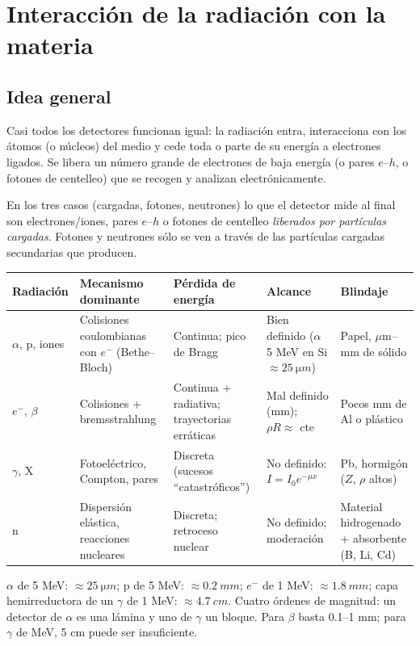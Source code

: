 \chapter{Interacción de la radiación con la materia}

\section{Idea general}
Casi todos los detectores funcionan igual: la radiación entra, interacciona con los átomos
(o núcleos) del medio y cede toda o parte de su energía a electrones ligados. Se libera un
número grande de electrones de baja energía (o pares $e$--$h$, o fotones de centelleo) que se
recogen y analizan electrónicamente.

\begin{clave}
En los tres casos (cargadas, fotones, neutrones) lo que el detector mide al final son
electrones/iones, pares $e$--$h$ o fotones de centelleo \emph{liberados por partículas cargadas}.
Fotones y neutrones sólo se ven a través de las partículas cargadas secundarias que producen.
\end{clave}

\begin{center}\small
\begin{tabularx}{\linewidth}{lXXXX}
\toprule
Radiación & Mecanismo dominante & Pérdida de energía & Alcance & Blindaje \\
\midrule
$\alpha$, p, iones & Colisiones coulombianas con $e^-$ (Bethe--Bloch) & Continua; pico de Bragg & Bien definido ($\alpha$ 5 MeV en Si $\approx\SI{25}{\micro m}$) & Papel, $\mu$m--mm de sólido\\
$e^-$, $\beta$ & Colisiones + bremsstrahlung & Continua + radiativa; trayectorias erráticas & Mal definido (mm); $\rho R\approx$ cte & Pocos mm de Al o plástico\\
$\gamma$, X & Fotoeléctrico, Compton, pares & Discreta (sucesos ``catastróficos'') & No definido: $I=I_0e^{-\mu x}$ & Pb, hormigón ($Z$, $\rho$ altos)\\
n & Dispersión elástica, reacciones nucleares & Discreta; retroceso nuclear & No definido; moderación & Material hidrogenado + absorbente (B, Li, Cd)\\
\bottomrule
\end{tabularx}
\end{center}

\begin{dato}
$\alpha$ de 5 MeV: $\approx\SI{25}{\micro m}$; p de 5 MeV: $\approx\SI{0.2}{mm}$; $e^-$ de 1 MeV: $\approx\SI{1.8}{mm}$;
capa hemirreductora de un $\gamma$ de 1 MeV: $\approx\SI{4.7}{cm}$. Cuatro órdenes de magnitud:
un detector de $\alpha$ es una lámina y uno de $\gamma$ un bloque. Para $\beta$ basta 0.1--1 mm;
para $\gamma$ de MeV, 5 cm puede ser insuficiente.
\end{dato}

